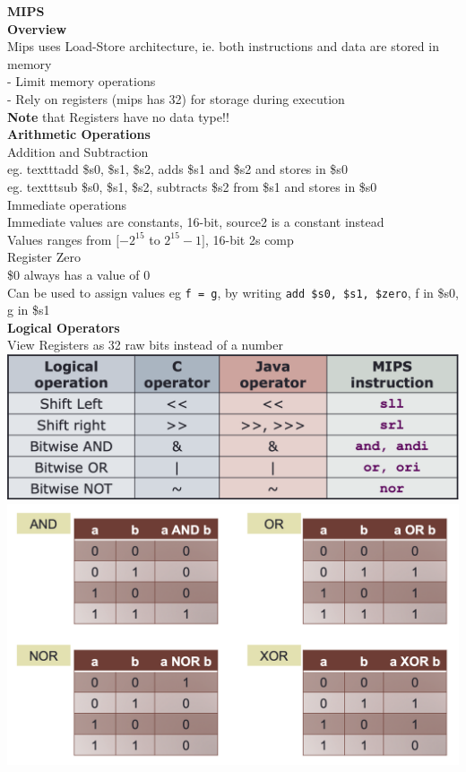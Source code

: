\documentclass[10pt, a4paper]{article}
\newcommand{\highlight}[1]{{\color{red}\textbf{#1}}}
\begin{document}
\begin{multicols*}{3}
		{\normalsize\textbf{MIPS}}\\
		\textbf{Overview}\\
		Mips uses Load-Store architecture, ie. both instructions and data are stored in memory\\
		- Limit memory operations\\
		- Rely on registers (mips has 32) for storage during execution\\
		\highlight{Note} that Registers have no data type!!\\
		
		\textbf{Arithmetic Operations}\\
		Addition and Subtraction\\
		eg. texttt{add \$s0, \$s1, \$s2}, adds \$s1 and \$s2 and stores in \$s0\\
		eg. texttt{sub \$s0, \$s1, \$s2}, subtracts \$s2 from \$s1 and stores in \$s0\\		
		
		Immediate operations\\
		Immediate values are constants, 16-bit, source2 is a constant instead\\
		Values ranges from $[-2^{15}$ to $2^{15}-1]$, 16-bit 2s comp\\
		
		Register Zero\\
		\$0 always has a value of 0\\
		Can be used to assign values eg \texttt{f = g}, by writing \texttt{add \$s0, \$s1, \$zero}, f in \$s0, g in \$s1\\
		
		\textbf{Logical Operators}\\
		View Registers as 32 raw bits instead of a number\\
		\includegraphics[scale=0.25]{./assets/logicalOperators}\\
		\includegraphics[scale=.25]{./assets/truthTables}\\
		

\end{multicols*}
\end{document}
